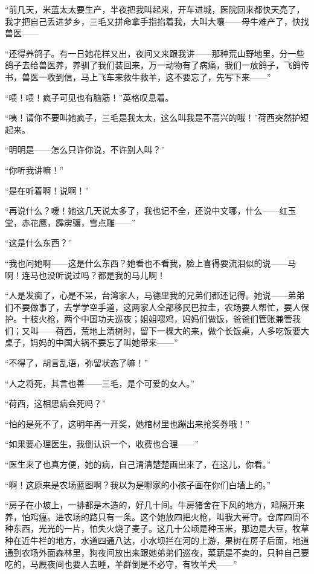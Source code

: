 \par “前几天，米蓝太太要生产，半夜把我叫起来，开车进城，医院回来都快天亮了，我才把自己丢进梦乡，三毛又拼命拿手指掐着我，大叫大嚷——母牛难产了，快找兽医——
\par “还得养鸽子。有一日她花样又出，夜间又来跟我讲——那种荒山野地里，分一些鸽子去给兽医养，养驯了我们装回来，万一动物有了病痛，我们一放鸽子，飞鸽传书，兽医一收到信，马上飞车来救牛救羊，这不要忘了，先写下来——”
\par “啧！啧！疯子可见也有脑筋！”英格叹息着。
\par “咦！请你不要叫她疯子，三毛是我太太，这么叫我是不高兴的哦！”荷西突然护短起来。
\par “明明是——怎么只许你说，不许别人叫？”
\par “你听我讲嘛！”
\par “是在听着啊！说啊！”
\par “再说什么？嗳！她这几天说太多了，我也记不全，还说中文哪，什么——红玉堂，赤花鹰，霹雳骧，雪点雕——”
\par “这是什么东西？”
\par “我也问她啊——这是什么东西？她看也不看我，脸上喜得要流泪似的说——马啊！连马也没听说过吗？都是我的马儿啊！
\par “人是发痴了，心是不呆，台湾家人，马德里我的兄弟们都还记得。她说——弟弟们不要做事了，去学学空手道，这两家人全部移民巴拉圭，农场要人帮忙，要人保护。十枝火枪，两个中国功夫巡夜；姐姐喂鸡，妈妈们做饭，爸爸们管账兼管我们；又叫——荷西，荒地上清树时，留下一棵大的来，做个长饭桌，人多吃饭要大桌子，妈妈的中国大锅不要忘了叫她带来——”
\par “不得了，胡言乱语，弥留状态了嘛！”
\par “人之将死，其言也善——三毛，是个可爱的女人。”
\par “荷西，这相思病会死吗？”
\par “怕的是死不了，这明年再一开奖，她棺材里也蹦出来抢奖券哦！”
\par “如果要心理医生，我倒认识一个，收费也合理——”
\par “医生来了也真方便，她的病，自己清清楚楚画出来了，在这儿，你看。”
\par “啊！这原来是农场蓝图啊？我以为是哪家的小孩子画在你们白墙上的。”
\par “房子在小坡上，一排都是木造的，好几十间。牛房猪舍在下风的地方，鸡隔开来养，怕鸡瘟。进农场的路只有一条。这个她放四把火枪，叫我大哥守。仓库四周不种东西，光光的一片，怕失火烧了麦子。这几十公顷是种玉米，那边是大豆，牧草种在近牛栏的地方，水道四通八达，小水坝拦在河的上游，果树在房子后面，地道通到农场外面森林里，狗夜间放出来跟她弟弟们巡夜，菜蔬是不卖的，只种自己要吃的，马厩夜间也要人去睡，羊群倒是不必守，有牧羊犬——”
